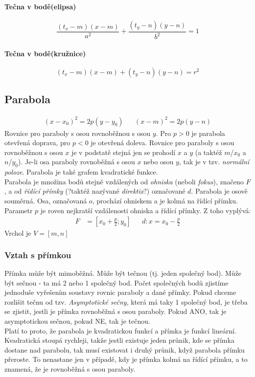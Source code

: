 \documentclass[12pt]{article}
\begin{document}
\paragraph{Tečna v bodě(elipsa)}
\begin{equation}
\frac{(t_x-m)(x-m)}{a^2} + \frac{(t_y-n)(y-n)}{b^2} = 1
\end{equation}
\paragraph{Tečna v bodě(kružnice)}
\begin{equation}
(t_x -m)(x-m) + (t_y -n)(y-n) = r^2
\end{equation}


\subsection{Parabola}
\begin{align}
(x-x_0)^2 = 2p(y-y_0) && (x-m)^2 = 2p(y-n) 
\end{align}
Rovnice pro paraboly s osou rovnoběžnou s osou $y$. Pro $p>0$ je parabola otevřená doprava, pro $p<0$ je otevřená doleva. Rovnice pro paraboly s osou rovnoběžnou s osou $x$ je v podstatě stejná jen se prohodí $x$ a $y$ (a taktéž $m$/$x_0$ a $n$/$y_0$). Je-li osa paraboly rovnoběžná s osou $x$ nebo osou $y$, tak je v tzv. \emph{normální poloze}. Parabola je také grafem kvadratické funkce.\\
Parabola je množina bodů stejně vzdálených od \emph{ohniska} (neboli \emph{fokus}), značeno $F$, a od \emph{řídící přímky} (?taktéž nazývané \emph{direktix}?) označované $d$. Parabola je osově souměrná. Osa, označovaná $o$, prochází ohniskem a je kolmá na řídící přímku. Parametr $p$ je roven nejkratší vzdálenosti ohniska a řídící přímky. Z toho vyplývá:
\begin{align}
F &= \left[ x_0 + \frac{p}{2} ; y_0 \right] && d: x = x_0 - \frac{p}{2}
\end{align}
Vrchol je $ V = \left[ m,n \right]$
\subsubsection{Vztah s přímkou}
Přímka může být mimoběžná. Může být tečnou (tj. jeden společný bod). Může být sečnou - ta má 2 nebo 1 společný bod. Počet společných bodů zjistíme jednoduše vyřešením soustavy rovnic paraboly a dané přímky. Pokud chceme rozlišit tečnu od tzv. \emph{Asymptotické sečny}, která má taky 1 společný bod, je třeba se zjistit, jestli je přímka rovnoběžná s osou paraboly. Pokud ANO, tak je asymptotickou sečnou, pokud NE, tak je tečnou.\\
Platí to proto, že parabola je kvadratickou funkcí a přímka je funkcí lineární. Kvadratická stoupá rychleji, takže jestli existuje jeden průnik, kde se přímka dostane nad parabolu, tak musí existovat i druhý průnik, když parabola přímku přeroste. To nenastane jen v případě, kdy je přímka kolmá na řídící přímku, a to znamená, že je rovnoběžná s osou paraboly.
\end{document}
